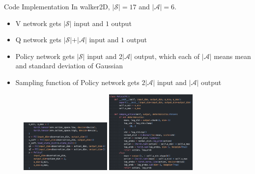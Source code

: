 \documentclass[8pt]{beamer}
\begin{document}
\begin{frame}{Code Implementation}
    In walker2D, $\vert \mathcal{S} \vert = 17$ and $\vert \mathcal{A} \vert = 6$.

    \begin{itemize}
        \item V network gets $\vert \mathcal{S} \vert$ input and $1$ output
        \item Q network gets $\vert \mathcal{S} \vert + \vert \mathcal{A} \vert$ input and $1$ output
        \item Policy network gets $\vert \mathcal{S} \vert$ input and $2\vert \mathcal{A} \vert$ output, which each of $\vert \mathcal{A} \vert$ means mean and standard deviation of Gaussian
        \item Sampling function of Policy network gets $2 \vert \mathcal{A} \vert$ input and $\vert \mathcal{A} \vert$ output
    
    \end{itemize}

    
    \begin{figure}
        \centering
        \includegraphics[width=0.4\textwidth]{fig3.png}
        \includegraphics[width=0.4\textwidth]{fig2.png}
    \end{figure}

\end{frame}
\end{document}

